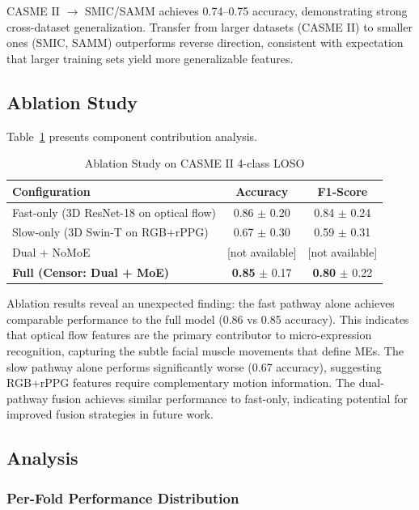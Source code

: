 CASME II $\rightarrow$ SMIC/SAMM achieves 0.74--0.75 accuracy, demonstrating strong cross-dataset generalization. Transfer from larger datasets (CASME II) to smaller ones (SMIC, SAMM) outperforms reverse direction, consistent with expectation that larger training sets yield more generalizable features.

\subsection{Ablation Study}

Table~\ref{tab:ablation} presents component contribution analysis.

\begin{table}[htbp]
\centering
\caption{Ablation Study on CASME II 4-class LOSO}
\label{tab:ablation}
\begin{tabular}{lcc}
\toprule
Configuration & Accuracy & F1-Score \\
\midrule
Fast-only (3D ResNet-18 on optical flow) & 0.86 $\pm$ 0.20 & 0.84 $\pm$ 0.24 \\
Slow-only (3D Swin-T on RGB+rPPG) & 0.67 $\pm$ 0.30 & 0.59 $\pm$ 0.31 \\
Dual + NoMoE & [not available] & [not available] \\
\textbf{Full (Censor: Dual + MoE)} & \textbf{0.85} $\pm$ 0.17 & \textbf{0.80} $\pm$ 0.22 \\
\bottomrule
\end{tabular}
\end{table}

Ablation results reveal an unexpected finding: the fast pathway alone achieves comparable performance to the full model (0.86 vs 0.85 accuracy). This indicates that optical flow features are the primary contributor to micro-expression recognition, capturing the subtle facial muscle movements that define MEs. The slow pathway alone performs significantly worse (0.67 accuracy), suggesting RGB+rPPG features require complementary motion information. The dual-pathway fusion achieves similar performance to fast-only, indicating potential for improved fusion strategies in future work.

\subsection{Analysis}

\subsubsection{Per-Fold Performance Distribution}

